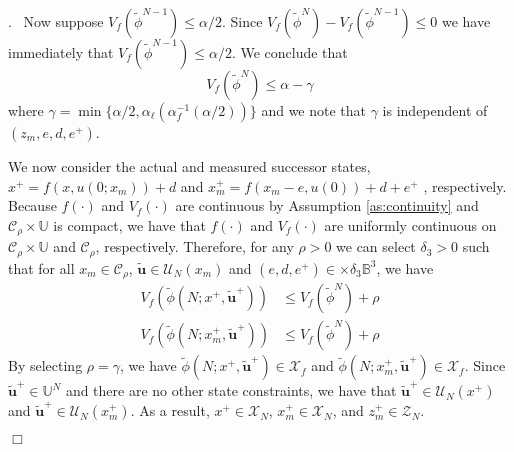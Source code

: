 \documentclass{article}
\newenvironment{proof}{\noindent {\em Proof}.\ }{\hspace*{\fill}$\Box$\medskip\\}
\begin{document}
\begin{proof}
Now suppose $V_f(\tilde{\phi}^{N-1}) \leq \alpha/2$. Since
$V_f(\tilde{\phi}^N) - V_f(\tilde{\phi}^{N-1}) \leq 0$
we have immediately that
$V_f(\tilde{\phi}^{N-1}) \leq \alpha/2$.
We conclude that 
\begin{equation*}
V_f(\tilde{\phi}^N) \leq \alpha - \gamma
\end{equation*}
where $\gamma = \min\{\alpha/2,\alpha_\ell(\alpha_f^{-1}(\alpha/2))\}$ and we note that $\gamma$ is independent of
$(z_m,e,d,e^+)$.

We now consider the actual and measured successor states, $x^+ = f(x,u(0;x_m))+d$ and $x_m^+ = f(x_m-e,u(0))+d+e^+$
, respectively. Because $f(\cdot)$ and $V_f(\cdot)$ are continuous by Assumption \ref{as:continuity} and
$\mathcal{C}_\rho \times \mathbb{U}$ is compact, we have that $f(\cdot)$ and $V_f(\cdot)$ are uniformly continuous on 
$\mathcal{C}_\rho \times \mathbb{U}$ and $\mathcal{C}_\rho$, respectively.
Therefore, for any $\rho > 0$ we can select $\delta_3 > 0$ such that for all 
$x_m \in \mathcal{C}_\rho$, $\tilde{\mathbf{u}} \in \mathcal{U}_N(x_m)$ and $(e,d,e^+) \in  \times \delta_3\mathbb{B}^3$, 
we have 
\begin{align*}
V_f(\tilde{\phi}(N;x^+,\tilde{\mathbf{u}}^+))  &\leq V_f(\tilde{\phi}^N) + \rho \\
V_f(\tilde{\phi}(N;x_m^+,\tilde{\mathbf{u}}^+))  &\leq V_f(\tilde{\phi}^N) + \rho
\end{align*}
By selecting $\rho = \gamma$, we have $\tilde{\phi}(N;x^+,\tilde{\mathbf{u}}^+) \in \mathcal{X}_f$ and 
$\tilde{\phi}(N;x_m^+,\tilde{\mathbf{u}}^+) \in \mathcal{X}_f$. Since $\tilde{\mathbf{u}}^+ \in \mathbb{U}^N$ and there are
no other state constraints, we have that $\tilde{\mathbf{u}}^+ \in \mathcal{U}_N(x^+)$ and 
$\tilde{\mathbf{u}}^+ \in \mathcal{U}_N(x_m^+)$. As a result, $x^+ \in \mathcal{X}_N$, $x_m^+ \in \mathcal{X}_N$,
and $z_m^+ \in \mathcal{Z}_N$.


\end{proof}
\end{document}
